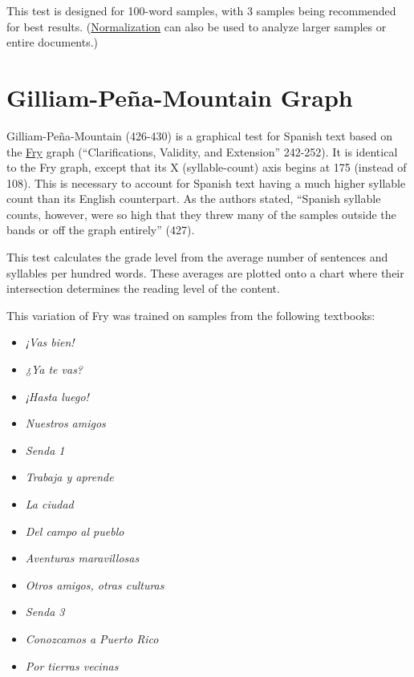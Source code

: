 \documentclass[
]{book}
\providecommand{\tightlist}{%
  \setlength{\itemsep}{0pt}\setlength{\parskip}{0pt}}
\theoremstyle{definition}
\theoremstyle{definition}
\theoremstyle{definition}
\theoremstyle{definition}
\theoremstyle{remark}
\begin{document}
This test is designed for 100-word samples, with 3 samples being recommended for best results. (\protect\hyperlink{glossary}{Normalization} can also be used to analyze larger samples or entire documents.)

\newpage

\hypertarget{gilliam-pena-mountain-fry-graph}{%
\section{\texorpdfstring{Gilliam-Peña-Mountain Graph}{Gilliam-Peña-Mountain Graph}}\label{gilliam-pena-mountain-fry-graph}}

Gilliam-Peña-Mountain (426-430) is a graphical test for Spanish text based on the \protect\hyperlink{fry-test}{Fry} graph (``Clarifications, Validity, and Extension'' 242-252). It is identical to the Fry graph, except that its X (syllable-count) axis begins at 175 (instead of 108). This is necessary to account for Spanish text having a much higher syllable count than its English counterpart. As the authors stated, ``Spanish syllable counts, however, were so high that they threw many of the samples outside the bands or off the graph entirely'' (427).

This test calculates the grade level from the average number of sentences and syllables per hundred words. These averages are plotted onto a chart where their intersection determines the reading level of the content.

This variation of Fry was trained on samples from the following textbooks:

\begin{itemize}
\tightlist
\item
  \emph{¡Vas bien!}
\item
  \emph{¿Ya te vas?}
\item
  \emph{¡Hasta luego!}
\item
  \emph{Nuestros amigos}
\item
  \emph{Senda 1}
\item
  \emph{Trabaja y aprende}
\item
  \emph{La ciudad}
\item
  \emph{Del campo al pueblo}
\item
  \emph{Aventuras maravillosas}
\item
  \emph{Otros amigos, otras culturas}
\item
  \emph{Senda 3}
\item
  \emph{Conozcamos a Puerto Rico}
\item
  \emph{Por tierras vecinas}
\end{itemize}
\end{document}
